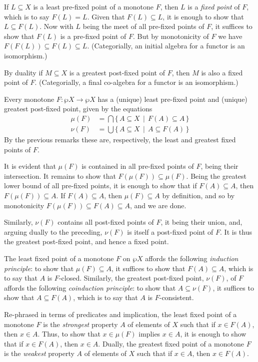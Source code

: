 \documentclass[11pt,twoside]{article}
\begin{document}
If $L\subseteq X$ is a least pre-fixed point of a monotone $F$, then $L$ is a \emph{fixed
point} of $F$, which is to say $F(L)=L$. Given that $F(L)\subseteq L$, it is enough to
show that $L\subseteq F(L)$. Now with $L$ being the meet of all pre-fixed points of $F$,
it suffices to show that $F(L)$ is a pre-fixed point of $F$. But by monotonicity of $F$ we
have $F(F(L))\subseteq F(L)\subseteq L$. (Categorially, an initial algebra for a functor
is an isomorphism.)

By duality if $M\subseteq X$ is a greatest post-fixed point of $F$, then $M$ is also a
fixed point of $F$. (Categorially, a final co-algebra for a functor is an isomorphism.)

Every monotone $F:\wp{X}\to\wp{X}$ has a (unique) least pre-fixed point and (unique)
greatest post-fixed point, given by the equations \begin{align*} \mu(F) & =
\bigcap\{\,A\subseteq X\,\mid\, F(A)\subseteq A\,\} \\ \nu(F) & = \bigcup\{\,A\subseteq
X\,\mid\,A\subseteq F(A)\,\} \end{align*} By the previous remarks these are, respectively,
the least and greatest fixed points of $F$.

It is evident that $\mu(F)$ is contained in all pre-fixed points of $F$, being their
intersection. It remains to show that $F(\mu(F))\subseteq \mu(F)$. Being the greatest
lower bound of all pre-fixed points, it is enough to show that if $F(A)\subseteq A$, then
$F(\mu(F))\subseteq A$. If $F(A)\subseteq A$, then $\mu(F)\subseteq A$ by definition, and
so by monotonicity $F(\mu(F))\subseteq F(A)\subseteq A$, and we are done.

Similarly, $\nu(F)$ contains all post-fixed points of $F$, it being their union, and,
arguing dually to the preceding, $\nu(F)$ is itself a post-fixed point of $F$. It is thus
the greatest post-fixed point, and hence a fixed point.

The least fixed point of a monotone $F$ on $\wp{X}$ affords the following \emph{induction
  principle}: to show that $\mu(F)\subseteq A$, it suffices to show that
$F(A)\subseteq A$, which is to say that $A$ is $F$-closed. Similarly, the greatest post-fixed
point, $\nu(F)$, of $F$ affords the following \emph{coinduction principle}: to show that
$A\subseteq \nu(F)$, it suffices to show that $A\subseteq F(A)$, which is to say that $A$ is $F$-consistent.

Re-phrased in terms of predicates and implication, the least fixed point of a monotone $F$
is the \emph{strongest} property $A$ of elements of $X$ such that if $x\in F(A)$, then
$x\in A$. Thus, to show that $x\in\mu(F)$ implies $x\in A$, it is enough to show that if
$x\in F(A)$, then $x\in A$.  Dually, the greatest fixed point of a monotone $F$ is the
\emph{weakest} property $A$ of elements of $X$ such that if $x\in A$, then $x\in F(A)$.
\end{document}
